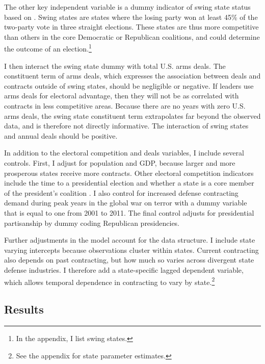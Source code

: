 \documentclass[12pt]{article}
\begin{document}
The other key independent variable is a dummy indicator of swing state status based on \citet{KrinerReeves2015}.
Swing states are states where the losing party won at least 45\% of the two-party vote in three straight elections.
These states are thus more competitive than others in the core Democratic or Republican coalitions, and could determine the outcome of an election.\footnote{In the appendix, I list swing states.}
%
%
%


I then interact the swing state dummy with total U.S. arms deals. 
The constituent term of arms deals, which expresses the association between deals and contracts outside of swing states, should be negligible or negative.
If leaders use arms deals for electoral advantage, then they will not be as correlated with contracts in less competitive areas. 
Because there are no years with zero U.S. arms deals, the swing state constituent term extrapolates far beyond the observed data, and is therefore not directly informative. 
The interaction of swing states and annual deals should be positive.


In addition to the electoral competition and deals variables, I include several controls. 
First, I adjust for population and GDP, because larger and more prosperous states receive more contracts. 
Other electoral competition indicators include the time to a presidential election and whether a state is a core member of the president's coalition \citep{KrinerReeves2015}. 
I also control for increased defense contracting demand during peak years in the global war on terror with a dummy variable that is equal to one from 2001 to 2011. 
The final control adjusts for presidential partisanship by dummy coding Republican presidencies. 


Further adjustments in the model account for the data structure.
I include state varying intercepts because observations cluster within states. 
Current contracting also depends on past contracting, but how much so varies across divergent state defense industries. 
I therefore add a state-specific lagged dependent variable, which allows temporal dependence in contracting to vary by state.\footnote{See the appendix for state parameter estimates.}


\subsection{Results}
\end{document}

